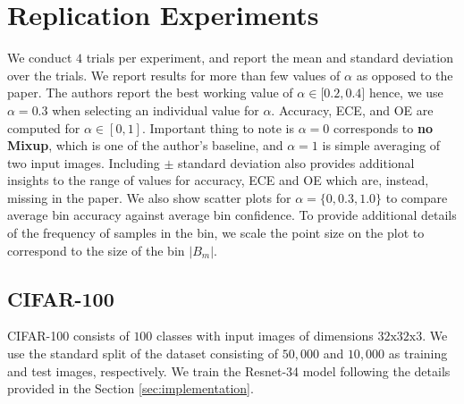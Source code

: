 \section{Replication Experiments}
\label{sec:experiments}
We conduct $4$ trials per experiment, and report the mean and standard deviation over the trials. We report results for more than few values of $\alpha$ as opposed to the paper. The authors report the best working value of $\alpha \in \lbrack 0.2, 0.4 \rbrack $ hence, we use $\alpha=0.3$ when selecting an individual value for $\alpha$. Accuracy, ECE, and OE are computed for $\alpha \in [0, 1]$. Important thing to note is $\alpha = 0$ corresponds to \textbf{no Mixup}, which is one of the author's baseline, and $\alpha=1$ is simple averaging of two input images. %
Including $\pm$ standard deviation also provides additional insights to the range of values for accuracy, ECE and OE which are, instead, missing in the paper.
We also show scatter plots for $\alpha=\{0, 0.3, 1.0\}$ to compare average bin accuracy against average bin confidence. To provide additional details of the frequency of samples in the bin, we scale the point size on the plot to correspond to the size of the bin $|B_m|$.


\subsection{CIFAR-100}
CIFAR-100 consists of $100$ classes with input images of dimensions $32\text{x}32\text{x}3$. We use the standard split of the dataset consisting of $50,000$ and $10,000$ as training and test images, respectively. We train the Resnet-34 model following the details provided in the Section \ref{sec:implementation}. 

